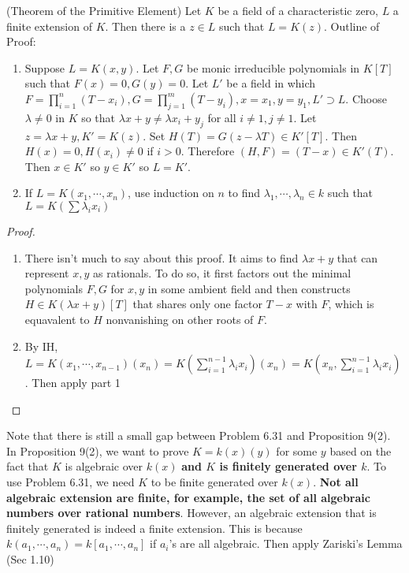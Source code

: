 \documentclass{solution}
\begin{document}
\begin{problem}{6.31}
    (Theorem of the Primitive Element) Let $K$ be a field of a characteristic zero, $L$ a finite extension of $K$. Then there is a $z \in L$ such that $L = K(z)$. Outline of Proof:
    \begin{enumerate}
        \item Suppose $L = K(x, y)$. Let $F, G$ be monic irreducible polynomials in $K[T]$ such that $F(x) = 0, G(y) = 0$. Let $L'$ be a field in which $F = \prod\limits_{i = 1}^{n} (T - x_i), G = \prod\limits_{j = 1}^{m} (T - y_i), x = x_1, y = y_1, L' \supset L$. Choose $\lambda \ne 0$ in $K$ so that $\lambda x + y \ne \lambda x_i + y_j$ for all $i \ne 1, j \ne 1$. Let $z = \lambda x + y, K' = K(z)$. Set $H(T) = G(z - \lambda T) \in K'[T]$. Then $H(x) = 0, H(x_i) \ne 0$ if $i \gt 0$. Therefore $(H, F) = (T - x) \in K'(T)$. Then $x \in K'$ so $y \in K'$ so $L = K'$.
        \item If $L = K(x_1, \cdots, x_n)$, use induction on $n$ to find $\lambda_1, \cdots, \lambda_n \in k$ such that $L = K(\sum \lambda_i x_i)$
    \end{enumerate}
\end{problem}

\begin{proof}
    \begin{enumerate}
        \item There isn't much to say about this proof. It aims to find $\lambda x + y$ that can represent $x, y$ as rationals. To do so, it first factors out the minimal polynomials $F, G$ for $x, y$ in some ambient field and then constructs $H \in K(\lambda x + y)[T]$ that shares only one factor $T - x$ with $F$, which is equavalent to $H$ nonvanishing on other roots of $F$.
        \item By IH, $L = K(x_1, \cdots, x_{n - 1})(x_n) = K(\sum\limits_{i = 1}^{n - 1} \lambda_i x_i)(x_n) = K(x_n, \sum\limits_{i = 1}^{n - 1} \lambda_i x_i)$. Then apply part 1
    \end{enumerate}
\end{proof}

Note that there is still a small gap between Problem 6.31 and Proposition 9(2). In Proposition 9(2), we want to prove $K = k(x)(y)$ for some $y$ based on the fact that $K$ is algebraic over $k(x)$ \textbf{and $K$ is finitely generated over $k$}. To use Problem 6.31, we need $K$ to be finite generated over $k(x)$. \textbf{Not all algebraic extension are finite, for example, the set of all algebraic numbers over rational numbers}. However, an algebraic extension that is finitely generated is indeed a finite extension. This is because $k(a_1, \cdots, a_n) = k[a_1, \cdots, a_n]$ if $a_i$'s are all algebraic. Then apply Zariski's Lemma (Sec 1.10)
\end{document}
